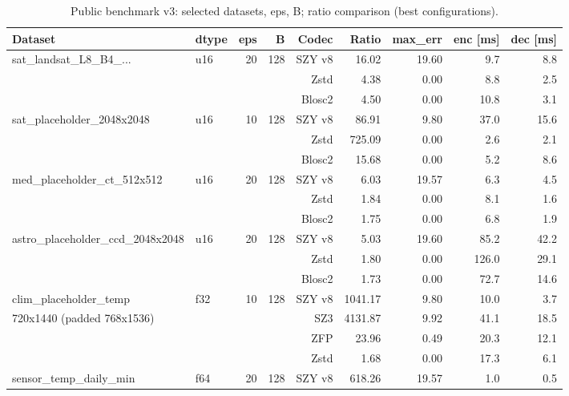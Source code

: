 \documentclass[11pt,a4paper]{article}
\begin{document}
\begin{table}[H]
\centering
\caption{Public benchmark v3: selected datasets, eps, B; ratio comparison (best configurations).}
\label{tab:public_bench_summary}
\begin{adjustbox}{max width=\textwidth}
\begin{tabular}{@{}llrrrrrrr@{}}
\toprule
Dataset & dtype & eps & B & Codec & Ratio & max\_err & enc [ms] & dec [ms] \\
\midrule
sat\_landsat\_L8\_B4\_... & u16 & 20 & 128 & SZY v8  & 16.02 & 19.60 & 9.7 & 8.8 \\
                          &     &    &     & Zstd    &  4.38 & 0.00  & 8.8 & 2.5 \\
                          &     &    &     & Blosc2  &  4.50 & 0.00  &10.8 & 3.1 \\
\midrule
sat\_placeholder\_2048x2048 & u16 & 10 & 128 & SZY v8  & 86.91 & 9.80 & 37.0 & 15.6 \\
                            &     &    &     & Zstd    &725.09 & 0.00 & 2.6 & 2.1 \\
                            &     &    &     & Blosc2  &15.68 & 0.00 & 5.2 & 8.6 \\
\midrule
med\_placeholder\_ct\_512x512 & u16 & 20 & 128 & SZY v8 & 6.03 & 19.57 & 6.3 & 4.5 \\
                              &     &    &     & Zstd   & 1.84 & 0.00  & 8.1 & 1.6 \\
                              &     &    &     & Blosc2 & 1.75 & 0.00  & 6.8 & 1.9 \\
\midrule
astro\_placeholder\_ccd\_2048x2048 & u16 & 20 & 128 & SZY v8 & 5.03 & 19.60 & 85.2 & 42.2 \\
                                   &     &    &     & Zstd   & 1.80 & 0.00 &126.0 & 29.1 \\
                                   &     &    &     & Blosc2 & 1.73 & 0.00 & 72.7 & 14.6 \\
\midrule
clim\_placeholder\_temp & f32 & 10 & 128 & SZY v8 &1041.17 & 9.80 & 10.0 & 3.7 \\
720x1440 (padded 768x1536)     &     &    &     & SZ3    &4131.87 & 9.92 & 41.1 &18.5 \\
                               &     &    &     & ZFP    & 23.96 & 0.49 & 20.3 &12.1 \\
                               &     &    &     & Zstd   &  1.68 & 0.00 & 17.3 & 6.1 \\
\midrule
sensor\_temp\_daily\_min & f64 & 20 & 128 & SZY v8 &618.26 &19.57 & 1.0 & 0.5 \\

\end{tabular}
\end{adjustbox}
\end{table}
\end{document}
